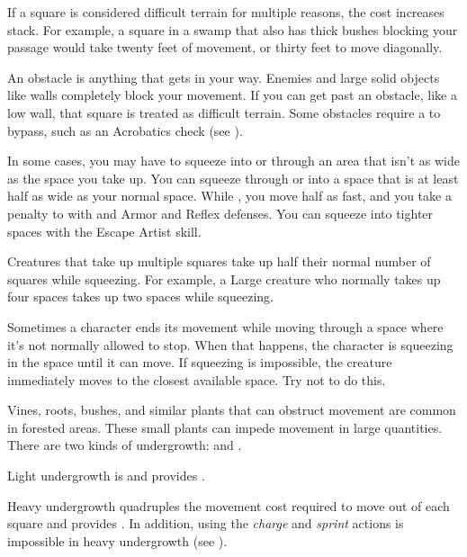         If a square is considered difficult terrain for multiple reasons, the cost increases stack.
        For example, a square in a swamp that also has thick bushes blocking your passage would take twenty feet of movement, or thirty feet to move diagonally.

        An obstacle is anything that gets in your way. Enemies and large solid objects like walls completely block your movement. If you can get past an obstacle, like a low wall, that square is treated as difficult terrain. Some obstacles require a  to bypass, such as an Acrobatics check (see ).

        \label{Squeezing}
        In some cases, you may have to squeeze into or through an area that isn't as wide as the space you take up.
        You can squeeze through or into a space that is at least half as wide as your normal space.
        While , you move half as fast, and you take a  penalty to  with  and Armor and Reflex defenses.
        You can squeeze into tighter spaces with the Escape Artist skill.

        Creatures that take up multiple squares take up half their normal number of squares while squeezing. For example, a Large creature who normally takes up four spaces takes up two spaces while squeezing.

         Sometimes a character ends its movement while moving through a space where it's not normally allowed to stop. When that happens, the character is squeezing in the space until it can move. If squeezing is impossible, the creature immediately moves to the closest available space. Try not to do this.

        \label{Undergrowth} Vines, roots, bushes, and similar plants that can obstruct movement are common in forested areas.
        These small plants can impede movement in large quantities.
        There are two kinds of undergrowth:  and .

        \label{Light Undergrowth}
        Light undergrowth is  and provides .

        \label{Heavy Undergrowth}
        Heavy undergrowth quadruples the movement cost required to move out of each square and provides .
        In addition, using the \textit{charge} and \textit{sprint} actions is impossible in heavy undergrowth (see ).

